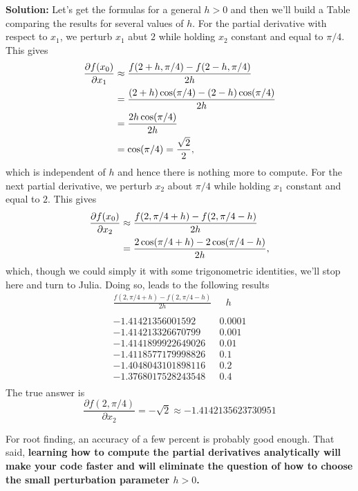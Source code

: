 \textbf{Solution:} Let's get the formulas for a general $h>0$ and then we'll build a Table comparing the results for several values of $h$. For the partial derivative with respect to $x_1$, we perturb $x_1$ abut $2$ while holding $x_2$ constant and equal to $\pi/4$. This gives
\begin{align*}
    \frac{\partial f(x_0)}{\partial x_1}& \approx\frac{f(2+h,\pi/4) - f(2-h,\pi/4)}{2h} \medskip \\
    &= \frac{ (2+h) \cos(\pi/4) - (2-h) \cos(\pi/4)}{2h} \medskip \\
        &= \frac{ 2h\cos(\pi/4)}{2h} \medskip \\
    &= \cos(\pi/4) = \frac{\sqrt{2}}{2},
\end{align*}
which is independent of $h$ and hence there is nothing more to compute. For the next partial derivative, we perturb $x_2$ about $\pi/4$ while holding $x_1$ constant and equal to $2$. This gives
\begin{equation}
\begin{aligned}
    \frac{\partial f(x_0)}{\partial x_2}&\approx \frac{f(2,\pi/4+h) - f(2,\pi/4-h)}{2h} \medskip \\
    &= \frac{ 2 \cos(\pi/4+h) - 2 \cos(\pi/4-h)}{2h},
\end{aligned}
\end{equation}
which, though we could simply it with some trigonometric identities, we'll stop here and turn to Julia. Doing so, leads to the following results
\begin{equation}
\begin{array}{ll}
\frac{f(2,\pi/4+h) - f(2,\pi/4-h)}{2h} & ~~~h \\
\\
-1.41421356001592 & 0.0001 \\
-1.414213326670799 & 0.001 \\
-1.4141899922649026 & 0.01 \\
-1.4118577179998826 & 0.1 \\
-1.4048043101898116 & 0.2 \\
-1.3768017528243548 & 0.4 \\
\end{array}
\end{equation}
The true answer is 
$$ \frac{\partial f(2, \pi/4)}{\partial x_2} = -\sqrt{2} \approx -1.4142135623730951 $$
\Qed

\begin{tcolorbox}[sharp corners, colback=green!30, colframe=green!80!blue,title=\textbf{Knowledge is Power}]
For root finding, an accuracy of a few percent is probably good enough. That said, \textbf{learning how to compute the partial derivatives analytically will make your code faster and will eliminate the question of how to choose the small perturbation parameter $h>0$.}
\end{tcolorbox}

